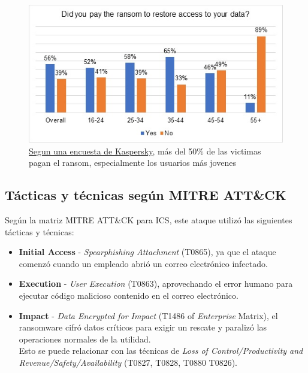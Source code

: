
\begin{figure}[htbp]
    \centering
    \includegraphics{images/ransom.jpg}
    \caption{\href{https://www.kaspersky.com/about/press-releases/over-half-of-ransomware-victims-pay-the-ransom-but-only-a-quarter-see-their-full-data-returned}{Segun una encuesta de Kaspersky}, más del 50\% de las victimas pagan el ransom, especialmente los usuarios más jovenes}
    \label{fig:ransom}
\end{figure}

\subsection{Tácticas y técnicas según MITRE ATT\&CK}
Según la matriz MITRE ATT\&CK para ICS, este ataque utilizó las siguientes tácticas y técnicas:

\begin{itemize}
    \item \textbf{Initial Access} - \textit{Spearphishing Attachment} (T0865), ya que el ataque comenzó cuando un empleado abrió un correo electrónico infectado.
    
    \item \textbf{Execution} - \textit{User Execution} (T0863), aprovechando el error humano para ejecutar código malicioso contenido en el correo electrónico.
    
    \item \textbf{Impact} - \textit{Data Encrypted for Impact} (T1486 of \textit{Enterprise} Matrix), el ransomware cifró datos críticos para exigir un rescate y paralizó las operaciones normales de la utilidad.\\
    Esto se puede relacionar con las técnicas de \textit{Loss of Control/Productivity and Revenue/Safety/Availability} (T0827, T0828, T0880 T0826).
\end{itemize}

